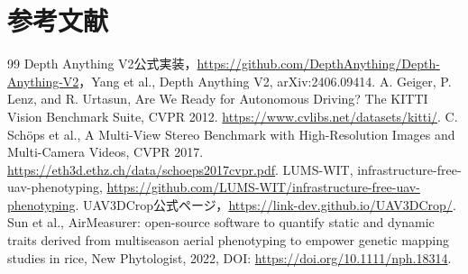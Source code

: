 \documentclass[a4paper,11pt]{ltjsarticle}
\begin{document}
\section*{参考文献}
\begin{thebibliography}{99}
 Depth Anything V2公式実装，\url{https://github.com/DepthAnything/Depth-Anything-V2}，Yang et al., Depth Anything V2, arXiv:2406.09414.
 A. Geiger, P. Lenz, and R. Urtasun, Are We Ready for Autonomous Driving? The KITTI Vision Benchmark Suite, CVPR 2012. \url{https://www.cvlibs.net/datasets/kitti/}.
 C. Schöps et al., A Multi-View Stereo Benchmark with High-Resolution Images and Multi-Camera Videos, CVPR 2017. \url{https://eth3d.ethz.ch/data/schoeps2017cvpr.pdf}.
 LUMS-WIT, infrastructure-free-uav-phenotyping, \url{https://github.com/LUMS-WIT/infrastructure-free-uav-phenotyping}.
 UAV3DCrop公式ページ，\url{https://link-dev.github.io/UAV3DCrop/}.
 Sun et al., AirMeasurer: open-source software to quantify static and dynamic traits derived from multiseason aerial phenotyping to empower genetic mapping studies in rice, New Phytologist, 2022, DOI: \url{https://doi.org/10.1111/nph.18314}.
\end{thebibliography}
\end{document}
